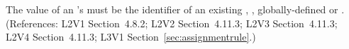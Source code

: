The value of an \AssignmentRule's  must be the identifier
of an existing \Compartment, \Species, globally-defined \Parameter or
\SpeciesReference.
(References: L2V1 Section~4.8.2; L2V2 Section~4.11.3; L2V3
Section~4.11.3; L2V4 Section~4.11.3; L3V1 Section~\ref{sec:assignmentrule}.)
